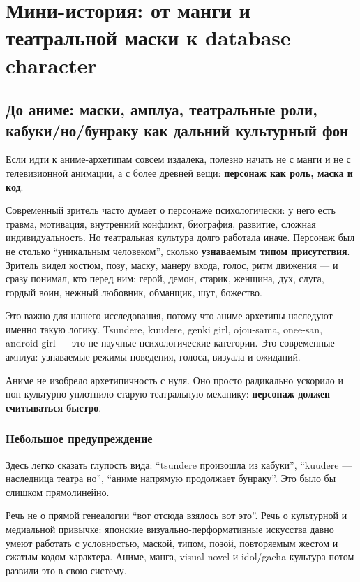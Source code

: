 \setcounter{chapter}{0}
\chapter{Мини-история: от манги и театральной маски к database character}

\setcounter{section}{0}
\section{До аниме: маски, амплуа, театральные роли, кабуки/но/бунраку как дальний культурный фон}

Если идти к аниме-архетипам совсем издалека, полезно начать не с манги и
не с телевизионной анимации, а с более древней вещи: \textbf{персонаж
как роль, маска и код}.

Современный зритель часто думает о персонаже психологически: у него есть
травма, мотивация, внутренний конфликт, биография, развитие, сложная
индивидуальность. Но театральная культура долго работала иначе. Персонаж
был не столько ``уникальным человеком'', сколько \textbf{узнаваемым
типом присутствия}. Зритель видел костюм, позу, маску, манеру входа,
голос, ритм движения --- и сразу понимал, кто перед ним: герой, демон,
старик, женщина, дух, слуга, гордый воин, нежный любовник, обманщик,
шут, божество.

Это важно для нашего исследования, потому что аниме-архетипы наследуют
именно такую логику. Tsundere, kuudere, genki girl, ojou-sama, onee-san,
android girl --- это не научные психологические категории. Это
современные амплуа: узнаваемые режимы поведения, голоса, визуала и
ожиданий.

Аниме не изобрело архетипичность с нуля. Оно просто радикально ускорило
и поп-культурно уплотнило старую театральную механику: \textbf{персонаж
должен считываться быстро}.

\subsection*{Небольшое предупреждение}

Здесь легко сказать глупость вида: ``tsundere произошла из кабуки'',
``kuudere --- наследница театра но'', ``аниме напрямую продолжает
бунраку''. Это было бы слишком прямолинейно.

Речь не о прямой генеалогии ``вот отсюда взялось вот это''. Речь о
культурной и медиальной привычке: японские визуально-перформативные
искусства давно умеют работать с условностью, маской, типом, позой,
повторяемым жестом и сжатым кодом характера. Аниме, манга, visual novel
и idol/\hspace{0pt}gacha-культура потом развили это в свою систему.

